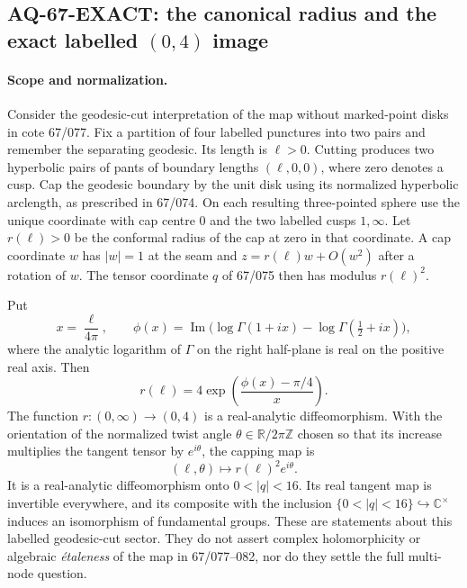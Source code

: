 \subsection{AQ-67-EXACT: the canonical radius and the exact labelled $(0,4)$ image}
\paragraph{Scope and normalization.}
Consider the geodesic-cut interpretation of the map without marked-point
disks in cote 67/077. Fix a partition of four labelled punctures into two
pairs and remember the separating geodesic. Its length is $\ell>0$.
Cutting produces two hyperbolic pairs of pants of boundary lengths
$(\ell,0,0)$, where zero denotes a cusp. Cap the geodesic boundary by the
unit disk using its normalized hyperbolic arclength, as prescribed in
67/074. On each resulting three-pointed sphere use the unique coordinate
with cap centre $0$ and the two labelled cusps $1,\infty$.
Let $r(\ell)>0$ be the conformal radius of the cap at zero in that
coordinate. A cap coordinate $w$ has $|w|=1$ at the seam and
$z=r(\ell)w+O(w^2)$ after a rotation of $w$.
The tensor coordinate $q$ of 67/075 then has modulus $r(\ell)^2$.

Put
\[
 x=\frac{\ell}{4\pi},\qquad
 \phi(x)=\operatorname{Im}\bigl(\log\Gamma(1+ix)
                       -\log\Gamma(\tfrac12+ix)\bigr),
\]
where the analytic logarithm of $\Gamma$ on the right half-plane is
real on the positive real axis. Then
\[
 \boxed{\quad r(\ell)=4\exp\!\left(\frac{\phi(x)-\pi/4}{x}\right).\quad}
                                                               \tag{AQ.67.1}
\]
The function $r:(0,\infty)\longrightarrow(0,4)$ is a real-analytic
diffeomorphism. With the orientation of the normalized twist angle
$\theta\in\mathbb R/2\pi\mathbb Z$ chosen so that its increase multiplies
the tangent tensor by $e^{i\theta}$, the capping map is
\[
 (\ell,\theta)\longmapsto r(\ell)^2e^{i\theta}.
                                                               \tag{AQ.67.2}
\]
It is a real-analytic diffeomorphism onto $0<|q|<16$.
Its real tangent map is invertible everywhere, and its composite with
the inclusion $\{0<|q|<16\}\hookrightarrow\mathbb C^\times$ induces an
isomorphism of fundamental groups. These are statements about this
labelled geodesic-cut sector. They do not assert complex holomorphicity
or algebraic \emph{\'etaleness} of the map in 67/077--082, nor do they
settle the full multi-node question.

